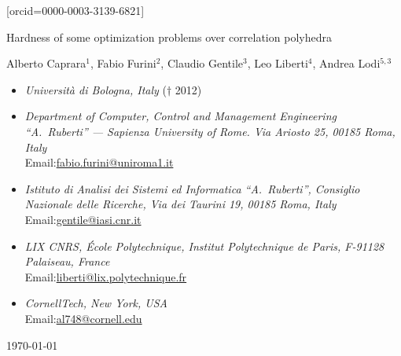 \documentclass[envcountsect,envcountsame]{svjour3}
\theoremstyle{changebreak}                %
\begin{document}
\author[4]{Leo Liberti}[orcid=0000-0003-3139-6821]
\cormark[4]
\fnmark[4]

\author[5]{Andrea Lodi}
\else

\thispagestyle{empty}
\begin{center} 

{\LARGE Hardness of some optimization problems over correlation polyhedra}
\par \bigskip
{\sc Alberto Caprara${}^1$, Fabio Furini${}^2$, Claudio Gentile${}^3$, Leo Liberti${}^{4}$, Andrea Lodi${}^{5,3}$} 
\par \bigskip
\begin{minipage}{15cm}
\begin{flushleft}
{\small
\begin{itemize}
\item[${}^1$] {\it Universit\`a di Bologna, Italy} ($\dag$ 2012)
\item[${}^2$] {\it Department of Computer, Control and Management Engineering ``A.~Ruberti'' --- Sapienza University of Rome. Via Ariosto 25, 00185 Roma, Italy} \\ Email:\url{fabio.furini@uniroma1.it}
\item[${}^3$] {\it Istituto di Analisi dei Sistemi ed Informatica ``A.~Ruberti'', Consiglio Nazionale delle Ricerche, Via dei Taurini 19, 00185 Roma, Italy} \\ Email:\url{gentile@iasi.cnr.it}
\item[${}^4$] {\it LIX CNRS, \'Ecole Polytechnique, Institut Polytechnique de Paris, F-91128 Palaiseau, France} \\ Email:\url{liberti@lix.polytechnique.fr}
\item[${}^5$] {\it CornellTech, New York, USA} \\ Email:\url{al748@cornell.edu}
\end{itemize}
}
\end{flushleft}
\end{minipage}
\par \medskip \today
\end{center}
\par \bigskip
\fi
\fi
\end{document}
